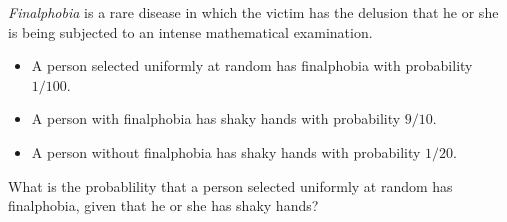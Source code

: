 \documentclass[12pt,oneside]{article}
\begin{document}
\newpage
\begin{problem}[12 points]  \textit{Finalphobia} is a rare disease in which
the victim has the delusion that he or she is being subjected to an
intense mathematical examination.
%
\begin{itemize}
\item A person selected uniformly at random has finalphobia with probability
$1/100$.
\item A person with finalphobia has shaky hands with probability $9/10$.
\item A person without finalphobia has shaky hands with probability $1/20$.
\end{itemize}
%
What is the probablility that a person selected uniformly at random
has finalphobia, given that he or she has shaky hands?


\end{problem}

\end{document}
